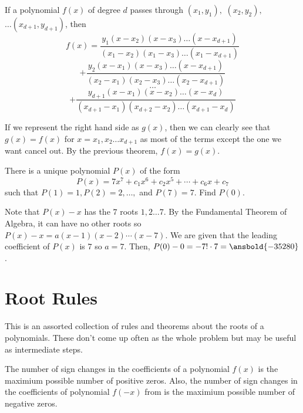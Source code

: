 \documentclass[mast]{lucky}
\begin{document}
\begin{theo}
If a polynomial $f(x)$ of degree $d$ passes through $(x_{1},y_{1}),$ $(x_{2},y_{2}),$ $\ldots (x_{d+1},y_{d+1})$, then
$$f(x)=\frac{y_{1}(x-x_{2})(x-x_{3})\ldots (x-x_{d+1})}{(x_{1}-x_{2})(x_{1}-x_{3})\ldots (x_{1}-x_{d+1})}$$
$$+\frac{y_{2}(x-x_{1})(x-x_{3})\ldots (x-x_{d+1})}{(x_{2}-x_{1})(x_{2}-x_{3})\ldots (x_{2}-x_{d+1})}$$
$$\ldots$$
$$+\frac{y_{d+1}(x-x_{1})(x-x_{2})\ldots (x-x_{d})}{(x_{d+1}-x_{1})(x_{d+2}-x_{2})\ldots (x_{d+1}-x_{d})}$$
\end{theo}

\begin{pro}
If we represent the right hand side as $g(x)$, then we can clearly see that $g(x)=f(x)$ for $x=x_{1},x_{2}\ldots x_{d+1}$ as most of the terms except the one we want cancel out. By the previous theorem, $f(x)=g(x)$.
\end{pro}

\begin{exam}[Mandelbrot]
There is a unique polynomial $P(x)$ of the form 
$$P(x)=7x^7+c_{1}x^6+c_{2}x^{5}+\cdots + c_{6}x+c_{7}$$
such that $P(1)=1,P(2)=2, \ldots,$ and $P(7)=7$. Find $P(0)$.
\end{exam}

\begin{sol}
Note that $P(x)-x$ has the $7$ roots $1,2\ldots 7$. By the Fundamental Theorem of Algebra, it can have no other roots so $P(x)-x=a(x-1)(x-2)\cdots(x-7)$. We are given that the leading coefficient of $P(x)$ is $7$ so $a=7$. Then, $P(0)-0=-7!\cdot 7 = \ansbold{-35280}$.
\end{sol}

\newpage
\section{Root Rules}
This is an assorted collection of rules and theorems about the roots of a polynomials. These don't come up often as the whole problem but may be useful as intermediate steps. 
\begin{theo}
The number of sign changes in the coefficients of a polynomial $f(x)$ is the maximium possible number of positive zeros. Also, the number of sign changes in the coefficients of polynomial $f(-x)$ from is the maximium possible number of negative zeros.
\end{theo}
\end{document}
